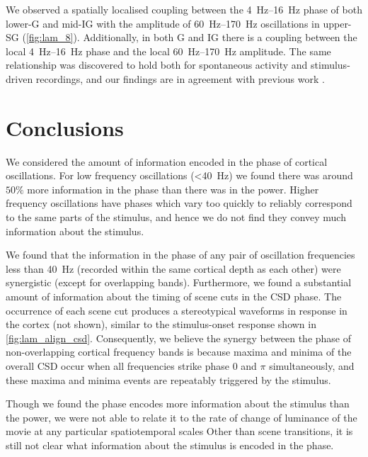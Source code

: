 We observed a spatially localised coupling between the \SIrange{4}{16}{Hz} phase of both lower-\ac{G} and mid-\ac{IG} with the amplitude of \SIrange{60}{170}{Hz} oscillations in upper-\ac{SG} (\autoref{fig:lam_8}).
Additionally, in both \ac{G} and \ac{IG} there is a coupling between the local \SIrange{4}{16}{Hz} phase and the local \SIrange{60}{170}{Hz} amplitude.
The same relationship was discovered to hold both for spontaneous activity and stimulus-driven recordings, and our findings are in agreement with previous work \citep{Spaak2012}.


\section{Conclusions}

We considered the amount of information encoded in the phase of cortical oscillations.
For low frequency oscillations (\SI{<40}{Hz}) we found there was around $50\%$ more information in the phase than there was in the power.
Higher frequency oscillations have phases which vary too quickly to reliably correspond to the same parts of the stimulus, and hence we do not find they convey much information about the stimulus.

We found that the information in the phase of any pair of oscillation frequencies less than \SI{40}{Hz} (recorded within the same cortical depth as each other) were synergistic (except for overlapping bands).
Furthermore, we found a substantial amount of information about the timing of scene cuts in the \ac{CSD} phase.
The occurrence of each scene cut produces a stereotypical waveforms in response in the cortex (not shown), similar to the stimulus-onset response shown in \autoref{fig:lam_align_csd}.
Consequently, we believe the synergy between the phase of non-overlapping cortical frequency bands is because maxima and minima of the overall \ac{CSD} occur when all frequencies strike phase $0$ and $\pi$ simultaneously, and these maxima and minima events are repeatably triggered by the stimulus.

Though we found the phase encodes more information about the stimulus than the power, we were not able to relate it to the rate of change of luminance of the movie at any particular spatiotemporal scales
Other than scene transitions, it is still not clear what information about the stimulus is encoded in the phase.

